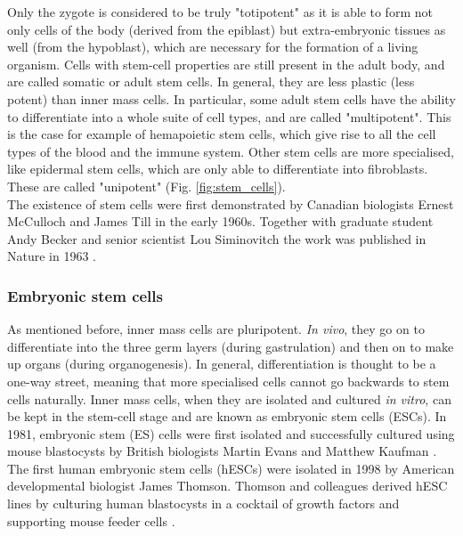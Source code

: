 Only the zygote is considered to be truly "totipotent" as it is able to form not only cells of the body (derived from the epiblast) but extra-embryonic tissues as well (from the hypoblast), which are necessary for the formation of a living organism.
Cells with stem-cell properties are still present in the adult body, and are called somatic or adult stem cells.
In general, they are less plastic (less potent) than inner mass cells.
In particular, some adult stem cells have the ability to differentiate into a whole suite of cell types, and are called "multipotent".
This is the case for example of hemapoietic stem cells, which give rise to all the cell types of the blood and the immune system.
Other stem cells are more specialised, like epidermal stem cells, which are only able to differentiate into fibroblasts.
These are called "unipotent" (Fig. \ref{fig:stem_cells}).\\

The existence of stem cells were first demonstrated by Canadian biologists Ernest McCulloch and James Till in the early 1960s.
Together with graduate student Andy Becker and senior scientist Lou Siminovitch the work was published in Nature in 1963 \cite{becker1963cytological}.


\subsubsection{Embryonic stem cells}

As mentioned before, inner mass cells are pluripotent.
\textit{In vivo}, they go on to differentiate into the three germ layers (during gastrulation) and then on to make up organs (during organogenesis).
In general, differentiation is thought to be a one-way street, meaning that more specialised cells cannot go backwards to stem cells naturally.
Inner mass cells, when they are isolated and cultured \textit{in vitro}, can be kept in the stem-cell stage and are known as embryonic stem cells (ESCs).
In 1981, embryonic stem (ES) cells were first isolated and successfully cultured using mouse blastocysts by British biologists Martin Evans and Matthew Kaufman \cite{evans1981establishment, martin1981isolation}.
The first human embryonic stem cells (hESCs) were isolated in 1998 by American developmental biologist James Thomson.
Thomson and colleagues derived hESC lines by culturing human blastocysts in a cocktail of growth factors and supporting mouse feeder cells \cite{thomson1998embryonic}. 


